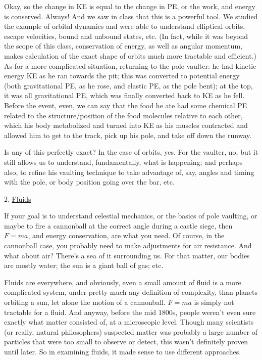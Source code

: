 \documentclass[12pt]{article}
\begin{document}
Okay, so the change in KE is equal to the change in PE, or the work, and energy is conserved. Always! And we saw in class that this is a powerful tool. We studied the example of orbital dynamics and were able to understand elliptical orbits, escape velocities, bound and unbound states, etc. (In fact, while it was beyond the scope of this class, conservation of energy, as well as angular momentum, makes calculation of the exact shape of orbits much more tractable and efficient.) As for a more complicated situation, returning to the pole vaulter: he had kinetic energy KE as he ran towards the pit; this was converted to potential energy (both gravitational PE, as he rose, and elastic PE, as the pole bent); at the top, it was all gravitational PE, which was finally converted back to KE as he fell. Before the event, even, we can say that the food he ate had some chemical PE related to the structure/position of the food molecules relative to each other, which his body metabolized and turned into KE as his muscles contracted and allowed him to get to the track, pick up his pole, and take off down the runway. 

Is any of this perfectly exact? In the case of orbits, yes. For the vaulter, no, but it still allows us to understand, fundamentally, what is happening; and perhaps also, to refine his vaulting technique to take advantage of, say, angles and timing with the pole, or body position going over the bar, etc.

2. \underline{Fluids}

If your goal is to understand celestial mechanics, or the basics of pole vaulting, or maybe to fire a cannonball at the correct angle during a castle siege, then $F=ma$, and energy conservation, are what you need. Of course, in the cannonball case, you probably need to make adjustments for air resistance. And what about air? There's a sea of it surrounding us. For that matter, our bodies are mostly water; the sun is a giant ball of gas; etc. 

Fluids are everywhere, and obviously, even a small amount of fluid is a more complicated system, under pretty much any definition of complexity, than planets orbiting a sun, let alone the motion of a cannonball. $F=ma$ is simply not tractable for a fluid. And anyway, before the mid 1800s, people weren't even sure exactly what matter consisted of, at a microscopic level. Though many scientists (or really, natural philosophers) suspected matter was probably a large number of particles that were too small to observe or detect, this wasn't definitely proven until later. So in examining fluids, it made sense to use different approaches. 
\end{document}
